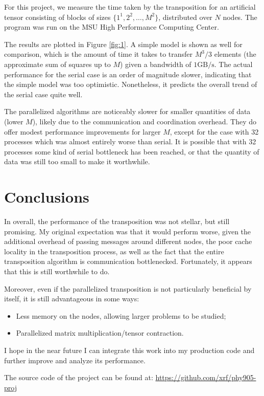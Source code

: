 \documentclass[fleqn, 12pt]{article}
\begin{document}
For this project, we measure the time taken by the transposition for an
artificial tensor consisting of blocks of sizes $\{1^1, 2^2, \ldots, M^2\}$,
distributed over $N$ nodes.  The program was run on the MSU High Performance
Computing Center.

The results are plotted in Figure \ref{fig:1}.  A simple model is shown as
well for comparison, which is the amount of time it takes to transfer $M^3/3$
elements (the approximate sum of squares up to $M$) given a bandwidth of
$1\mathrm{GB/s}$.  The actual performance for the serial case is an order of
magnitude slower, indicating that the simple model was too optimistic.
Nonetheless, it predicts the overall trend of the serial case quite well.

The parallelized algorithms are noticeably slower for smaller quantities of
data (lower $M$), likely due to the communication and coordination overhead.
They do offer modest performance improvements for larger $M$, except for the
case with 32 processes which was almost entirely worse than serial.  It is
possible that with 32 processes some kind of serial bottleneck has been
reached, or that the quantity of data was still too small to make it
worthwhile.

\section{Conclusions}

In overall, the performance of the transposition was not stellar, but still
promising.  My original expectation was that it would perform worse, given the
additional overhead of passing messages around different nodes, the poor cache
locality in the transposition process, as well as the fact that the entire
transposition algorithm is communication bottlenecked.  Fortunately, it
appears that this is still worthwhile to do.

Moreover, even if the parallelized transposition is not particularly
beneficial by itself, it is still advantageous in some ways:
\begin{itemize}
\item Less memory on the nodes, allowing larger problems to be studied;
\item Parallelized matrix multiplication/tensor contraction.
\end{itemize}

I hope in the near future I can integrate this work into my production code
and further improve and analyze its performance.

The source code of the project can be found at: \url{https://github.com/xrf/phy905-proj}
\end{document}

